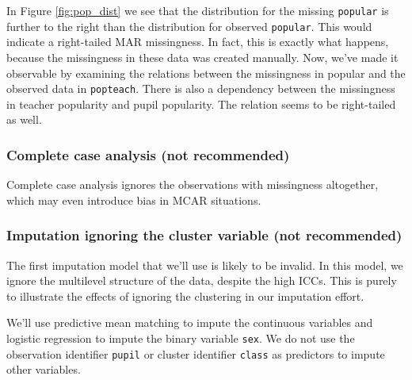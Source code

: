 \documentclass[
]{jss}
\begin{document}
In Figure \ref{fig:pop_dist} we see that the distribution for the
missing \texttt{popular} is further to the right than the distribution
for observed \texttt{popular}. This would indicate a right-tailed MAR
missingness. In fact, this is exactly what happens, because the
missingness in these data was created manually. Now, we've made it
observable by examining the relations between the missingness in popular
and the observed data in \texttt{popteach}. There is also a dependency
between the missingness in teacher popularity and pupil popularity. The
relation seems to be right-tailed as well.

\hypertarget{complete-case-analysis-not-recommended}{%
\subsubsection{Complete case analysis (not
recommended)}\label{complete-case-analysis-not-recommended}}

Complete case analysis ignores the observations with missingness
altogether, which may even introduce bias in MCAR situations.

\hypertarget{imputation-ignoring-the-cluster-variable-not-recommended}{%
\subsubsection{Imputation ignoring the cluster variable (not
recommended)}\label{imputation-ignoring-the-cluster-variable-not-recommended}}

The first imputation model that we'll use is likely to be invalid. In
this model, we ignore the multilevel structure of the data, despite the
high ICCs. This is purely to illustrate the effects of ignoring the
clustering in our imputation effort.

We'll use predictive mean matching to impute the continuous variables
and logistic regression to impute the binary variable \texttt{sex}. We
do not use the observation identifier \texttt{pupil} or cluster
identifier \texttt{class} as predictors to impute other variables.

\begin{CodeChunk}
\end{CodeChunk}
\end{document}

